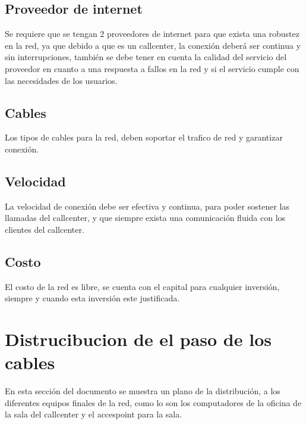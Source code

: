 \documentclass[12pt]{article}
\begin{document}
\subsection{\textbf{Proveedor de internet}}
Se requiere que se tengan 2 proveedores de internet para que exista una robustez en la red, ya que debido a que es un callcenter, la conexión deberá ser continua y sin interrupciones, también se debe tener en cuenta la calidad del servicio del proveedor en cuanto a una respuesta a fallos en la red y si el servicio cumple con las necesidades de los usuarios.

\subsection{\textbf{Cables}}
Los tipos de cables para la red, deben soportar el trafico de red y garantizar conexión.

\subsection{\textbf{Velocidad}}
La velocidad de conexión debe ser efectiva y continua, para poder sostener las llamadas del callcenter, y que siempre exista una comunicación fluida con los clientes del callcenter.

\subsection{\textbf{Costo}}
El costo de la red es libre, se cuenta con el capital para cualquier inversión, siempre y cuando esta inversión este justificada.

\pagebreak
\section{\textbf{Distrucibucion de el paso de los cables}}
En esta sección del documento se muestra un plano de la distribución, a los diferentes equipos finales de la red, como lo son los computadores de la oficina de la sala del callcenter y el accespoint para la sala.

\begin{center}
\end{center}
\end{document}

